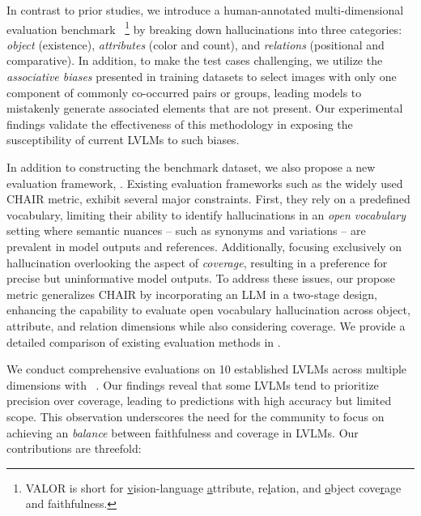 In contrast to prior studies, we introduce a human-annotated multi-dimensional evaluation benchmark \data~\footnote{VALOR is short for \underline{v}ision-language \underline{a}ttribute, re\underline{l}ation, and \underline{o}bject cove\underline{r}age and faithfulness.} by breaking down hallucinations into three categories: \textit{object} (existence), \textit{attributes} (color and count), and \textit{relations} (positional and comparative). In addition, to make the test cases challenging, we utilize the \textit{associative biases} \cite{li-etal-2023-evaluating,zhou2023analyzing} presented in training datasets to select images with only one component of commonly co-occurred pairs or groups, leading models to mistakenly generate associated elements that are not present. Our experimental findings validate the effectiveness of this methodology in exposing the susceptibility of current LVLMs to such biases.

In addition to constructing the benchmark dataset, we also propose a new evaluation framework, \eval{}. Existing evaluation frameworks such as the widely used CHAIR \cite{rohrbach-etal-2018-object} metric, exhibit several major constraints. First, they rely on a predefined vocabulary, limiting their ability to identify hallucinations in an \textit{open vocabulary} setting where semantic nuances -- such as synonyms and variations --  are prevalent in model outputs and references. Additionally, focusing exclusively on hallucination overlooking the aspect of \textit{coverage}, resulting in a preference for precise but uninformative model outputs. To address these issues, our propose \eval~ metric generalizes CHAIR by incorporating an LLM in a two-stage design, enhancing the capability to evaluate open vocabulary hallucination across object, attribute, and relation dimensions while also considering coverage. We provide a detailed comparison of existing evaluation methods in .

We conduct comprehensive evaluations on 10 established LVLMs across multiple dimensions with \data~. Our findings reveal that some LVLMs tend to prioritize precision over coverage, leading to predictions with high accuracy but limited scope. This observation underscores the need for the community to focus on achieving an \textit{balance} between faithfulness and coverage in LVLMs. Our contributions are threefold:

